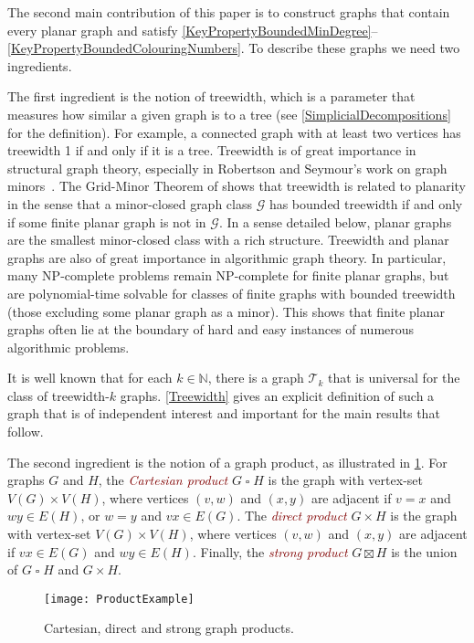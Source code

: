 \documentclass[a4paper,11pt]{article}
\newcommand{\defn}[1]{\textcolor{Maroon}{\emph{#1}}\index{#1}}
\theoremstyle{plain}
\theoremstyle{definition}
\newcommand{\CartProd}{\mathbin{\square}}
\newcommand{\GG}{\mathcal{G}}
\newcommand{\TT}{\mathcal{T}}
\newcommand{\NN}{\mathbb{N}}
\begin{document}
The second main contribution of this paper is to construct graphs that  contain every planar graph and satisfy \cref{KeyPropertyBoundedMinDegree}--\cref{KeyPropertyBoundedColouringNumbers}. To describe these graphs we need two ingredients. 

The first ingredient is the notion of treewidth, which is a parameter that measures how similar a given graph is to a tree (see \cref{SimplicialDecompositions} for the definition). For example, a connected graph with at least two vertices has treewidth 1 if and only if  it is a tree. Treewidth is of great importance in structural graph theory, especially in Robertson and Seymour's work on graph minors~\citep{RS-GraphMinors}. The Grid-Minor Theorem of \citet{RS-V} shows that treewidth is related to planarity in the sense that a minor-closed graph class $\GG$ has bounded treewidth if and only if some finite planar graph is not in $\GG$. In a sense detailed below, planar graphs are the smallest minor-closed class with a rich structure. Treewidth and planar graphs are also of great importance in algorithmic graph theory. In particular, many NP-complete problems remain NP-complete for finite planar graphs, but are polynomial-time solvable for classes of finite graphs with bounded treewidth (those excluding some planar graph as a minor). This shows that finite planar graphs often lie at the boundary of hard and easy instances of numerous algorithmic problems. 

It is well known that for each $k\in\NN$, there is a graph $\TT_k$ that is universal for the class of treewidth-$k$ graphs. \cref{Treewidth} gives an explicit definition of such a graph that is of independent interest and important for the main results that follow. 

The second ingredient is the notion of a graph product, as illustrated in \cref{ProductExample}. For graphs $G$ and $H$,  the \defn{Cartesian product} $G\CartProd H$ is the graph with vertex-set $V(G)\times V(H)$, where vertices $(v,w)$ and $(x,y)$ are adjacent if $v=x$ and $wy\in E(H)$, or $w=y$ and $vx \in E(G)$. The \defn{direct  product} $G\times H$ is the graph with vertex-set $V(G)\times V(H)$, where vertices $(v,w)$ and $(x,y)$ are adjacent if $vx\in E(G)$ and $wy\in E(H)$. Finally, the \defn{strong product} $G\boxtimes H$ is the union of $G\CartProd H$ and $G\times H$.

\begin{figure}[!ht]
\centering
\texttt{[image: ProductExample]}
\caption{Cartesian, direct and strong graph products.\label{ProductExample}}
\end{figure}
\end{document}
